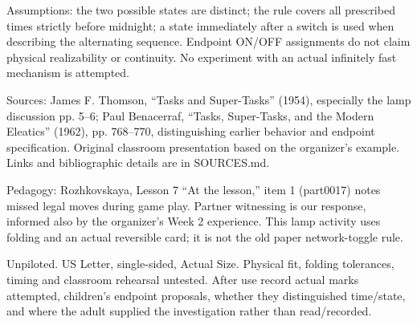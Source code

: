 \documentclass[11pt,letterpaper]{article}
\begin{document}
Assumptions: the two possible states are distinct; the rule covers all prescribed times strictly before midnight; a state immediately after a switch is used when describing the alternating sequence. Endpoint ON/OFF assignments do not claim physical realizability or continuity. No experiment with an actual infinitely fast mechanism is attempted.

Sources: James F. Thomson, ``Tasks and Super-Tasks'' (1954), especially the lamp discussion pp. 5--6; Paul Benacerraf, ``Tasks, Super-Tasks, and the Modern Eleatics'' (1962), pp. 768--770, distinguishing earlier behavior and endpoint specification. Original classroom presentation based on the organizer's example. Links and bibliographic details are in SOURCES.md.

Pedagogy: Rozhkovskaya, Lesson 7 ``At the lesson,'' item 1 (part0017) notes missed legal moves during game play. Partner witnessing is our response, informed also by the organizer's Week 2 experience. This lamp activity uses folding and an actual reversible card; it is not the old paper network-toggle rule.

Unpiloted. US Letter, single-sided, Actual Size. Physical fit, folding tolerances, timing and classroom rehearsal untested. After use record actual marks attempted, children's endpoint proposals, whether they distinguished time/state, and where the adult supplied the investigation rather than read/recorded.
\end{document}

